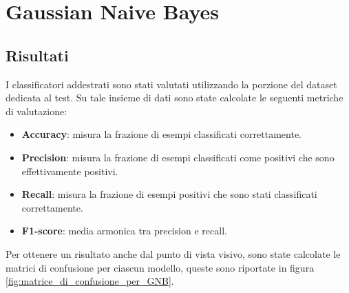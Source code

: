 \chapter{Gaussian Naive Bayes} \label{chp:bayes}

\section{Risultati}
I classificatori addestrati sono stati valutati utilizzando la porzione del 
dataset dedicata al test. Su tale insieme di dati sono state calcolate le
seguenti metriche di valutazione:
\begin{itemize}
    \item \textbf{Accuracy}: misura la frazione di esempi classificati correttamente.
    \item \textbf{Precision}: misura la frazione di esempi classificati come positivi
    che sono effettivamente positivi.
    \item \textbf{Recall}: misura la frazione di esempi positivi che sono stati
    classificati correttamente.
    \item \textbf{F1-score}: media armonica tra precision e recall.
\end{itemize}

Per ottenere un risultato anche dal punto di vista visivo, sono state calcolate
le matrici di confusione per ciascun modello, queste sono riportate in figura 
\ref{fig:matrice_di_confusione_per_GNB}.

